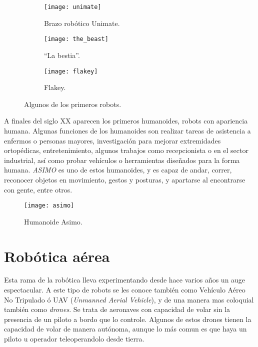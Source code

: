\begin{figure}[h]

  \centering
  \begin{subfigure}[h]{50mm}
    \texttt{[image: unimate]}
    \caption{Brazo robótico Unimate.}
    \label{fig:unimate}
  \end{subfigure}
  \begin{subfigure}[h]{0.35\textwidth}
    \texttt{[image: the\_beast]}
    \caption{``La bestia''.}
    \label{fig:the_beast}
  \end{subfigure}
  \begin{subfigure}[h]{40mm}
    \texttt{[image: flakey]}
    \caption{Flakey.}
    \label{fig:flakey}
  \end{subfigure}
  \caption{Algunos de los primeros robots.}\label{fig:robot_history_1}

\end{figure}

A finales del siglo XX aparecen los primeros humanoides, robots con apariencia humana. Algunas funciones de los humanoides son realizar tareas de asistencia a enfermos o personas mayores, investigación para mejorar extremidades ortopédicas, entretenimiento, algunos trabajos como recepcionista o en el sector industrial, así como probar vehículos o herramientas diseñados para la forma humana. \emph{ASIMO} es uno de estos humanoides, y es capaz de andar, correr, reconocer objetos en movimiento, gestos y posturas, y apartarse al encontrarse con gente, entre otros.\\

\begin{figure}[h]
  \centering
  \texttt{[image: asimo]}
  \caption{Humanoide Asimo.}
\end{figure}


\section{Robótica aérea}

Esta rama de la robótica lleva experimentando desde hace varios años un auge espectacular. A este tipo de robots se les conoce también como Vehículo Aéreo No Tripulado ó UAV (\emph{Unmanned Aerial Vehicle}), y de una manera mas coloquial también como \emph{drones}. Se trata de aeronaves con capacidad de volar sin la presencia de un piloto a bordo que lo controle. Algunos de estos drones tienen la capacidad de volar de manera autónoma, aunque lo más comun es que haya un piloto u operador teleoperandolo desde tierra.\\

